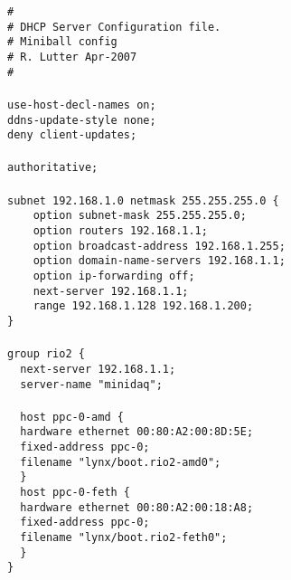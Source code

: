 \documentclass[10pt]{article}
\begin{document}
\verb+#+\\
\verb+# DHCP Server Configuration file.+\\
\verb+# Miniball config+\\
\verb+# R. Lutter Apr-2007+\\
\verb+#+\\
\verb++\\
\verb+use-host-decl-names on;+\\
\verb+ddns-update-style none;+\\
\verb+deny client-updates;+\\
\verb++\\
\verb+authoritative;+\\
\verb++\\
\verb+subnet 192.168.1.0 netmask 255.255.255.0 {+\\
\verb+    option subnet-mask 255.255.255.0;+\\
\verb+    option routers 192.168.1.1;+\\
\verb+    option broadcast-address 192.168.1.255;+\\
\verb+    option domain-name-servers 192.168.1.1;+\\
\verb+    option ip-forwarding off;+\\
\verb+    next-server 192.168.1.1;+\\
\verb+    range 192.168.1.128 192.168.1.200;+\\
\verb+}+\\
\verb++\\
\verb+group rio2 {+\\
\verb+  next-server 192.168.1.1;+\\
\verb+  server-name "minidaq";+\\
\verb++\\
\verb+  host ppc-0-amd {+\\
\verb+	hardware ethernet 00:80:A2:00:8D:5E;+\\
\verb+	fixed-address ppc-0;+\\
\verb+  filename "lynx/boot.rio2-amd0";+\\
\verb+  }+\\
\verb+  host ppc-0-feth {+\\
\verb+	hardware ethernet 00:80:A2:00:18:A8;+\\
\verb+	fixed-address ppc-0;+\\
\verb+  filename "lynx/boot.rio2-feth0";+\\
\verb+  }+\\
\verb+}+\\
\end{document}
